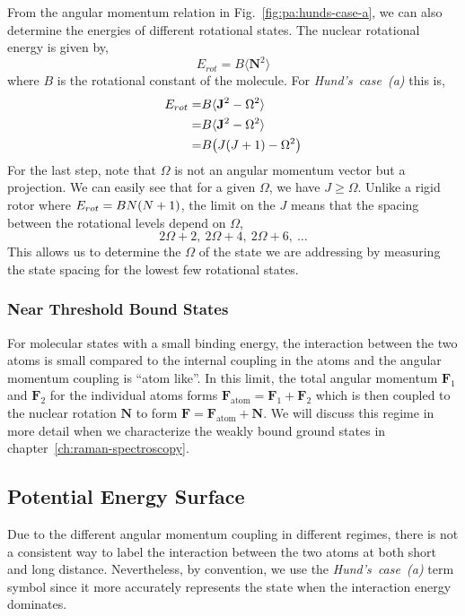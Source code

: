 From the angular momentum relation in Fig.~\ref{fig:pa:hunds-case-a},
we can also determine the energies of different rotational states.
The nuclear rotational energy is given by,
\[
  E_{rot}=B\langle \mathbf{N}^2 \rangle
\]
where $B$ is the rotational constant of the molecule.
For \textit{Hund's~case~(a)} this is,
\begin{align*}
  E_{rot}=&B\langle \mathbf{J}^2 - \Omega^2 \rangle\\
  =&B\langle \mathbf{J}^2 - \Omega^2 \rangle\\
  =&B{\left({J{\left({J+1}\right)}-\Omega^2}\right)}
\end{align*}
For the last step, note that $\Omega$ is not an angular momentum vector but a projection.
We can easily see that for a given $\Omega$, we have $J\geqslant\Omega$.
Unlike a rigid rotor where $E_{rot}=BN{\left({N+1}\right)}$,
the limit on the $J$ means that the spacing between the rotational levels depend on $\Omega$,
\[2\Omega+2,\ 2\Omega+4,\ 2\Omega+6,\ \dots\]
This allows us to determine the $\Omega$ of the state we are addressing
by measuring the state spacing for the lowest few rotational states.

\subsubsection{Near Threshold Bound States}
\label{ch:pa:structure:near-threshold}

For molecular states with a small binding energy, the interaction between the two atoms is
small compared to the internal coupling in the atoms and
the angular momentum coupling is ``atom like''.
In this limit, the total angular momentum $\mathbf{F}_1$ and $\mathbf{F}_2$
for the individual atoms forms $\mathbf{F}_{\mathrm{atom}}=\mathbf{F}_1+\mathbf{F}_2$
which is then coupled to the nuclear rotation $\mathbf{N}$
to form $\mathbf{F}=\mathbf{F}_{\mathrm{atom}}+\mathbf{N}$.
We will discuss this regime in more detail
when we characterize the weakly bound ground states in chapter~\ref{ch:raman-spectroscopy}.

\subsection{Potential Energy Surface}
\label{ch:pa:pes}

Due to the different angular momentum coupling in different regimes,
there is not a consistent way to label the interaction between the two atoms
at both short and long distance.
Nevertheless, by convention, we use the \textit{Hund's~case~(a)} term symbol
since it more accurately represents the state when the interaction energy dominates.

